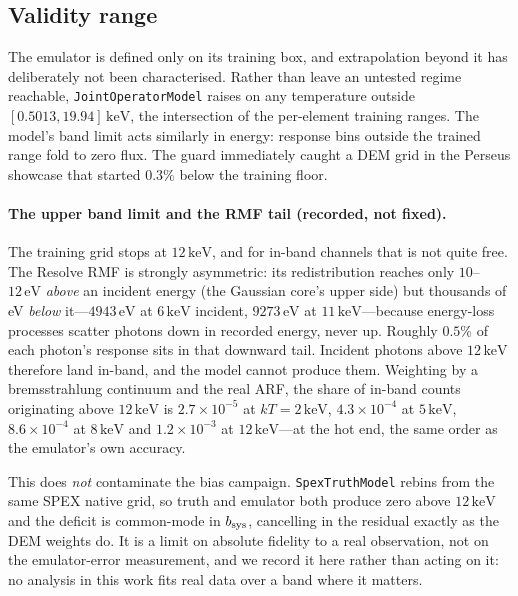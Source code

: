 \documentclass[11pt,a4paper]{article}
\newcommand{\kev}{\,\mathrm{keV}}
\newcommand{\code}[1]{\texttt{#1}}
\begin{document}
\subsection{Validity range}\label{sec:validity}
The emulator is defined only on its training box, and extrapolation beyond it
has deliberately not been characterised. Rather than leave an untested regime
reachable, \code{JointOperatorModel} raises on any temperature outside
$[0.5013, 19.94]\kev$, the intersection of the per-element training ranges. The
model's band limit acts similarly in energy: response bins outside the trained
range fold to zero flux. The guard immediately caught a DEM grid in the Perseus
showcase that started $0.3\%$ below the training floor.

\paragraph{The upper band limit and the RMF tail (recorded, not fixed).}
The training grid stops at $12\kev$, and for in-band channels that is not quite
free. The Resolve RMF is strongly asymmetric: its redistribution reaches only
$10$--$12\,\mathrm{eV}$ \emph{above} an incident energy (the Gaussian core's upper side)
but thousands of eV \emph{below} it---$4943\,\mathrm{eV}$ at $6\kev$ incident,
$9273\,\mathrm{eV}$ at $11\kev$---because energy-loss processes scatter photons down in
recorded energy, never up. Roughly $0.5\%$ of each photon's response sits in
that downward tail. Incident photons above $12\kev$ therefore land in-band,
and the model cannot produce them. Weighting by a bremsstrahlung continuum and
the real ARF, the share of in-band counts originating above $12\kev$ is
$2.7\times10^{-5}$ at $kT=2\kev$, $4.3\times10^{-4}$ at $5\kev$,
$8.6\times10^{-4}$ at $8\kev$ and $1.2\times10^{-3}$ at $12\kev$---at the hot
end, the same order as the emulator's own accuracy.

This does \emph{not} contaminate the bias campaign. \code{SpexTruthModel} rebins
from the same SPEX native grid, so truth and emulator both produce zero above
$12\kev$ and the deficit is common-mode in $b_{\rm sys}$, cancelling in the
residual exactly as the DEM weights do. It is a limit on absolute fidelity to a
real observation, not on the emulator-error measurement, and we record it here
rather than acting on it: no analysis in this work fits real data over a band
where it matters.
\end{document}
